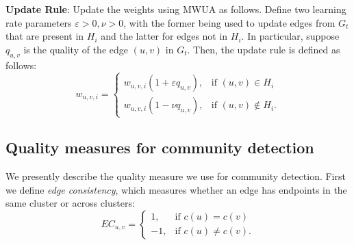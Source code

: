 \documentclass{article}
\begin{document}
\textbf{Update Rule}: Update the weights using MWUA as follows. Define two
learning rate parameters $\varepsilon > 0, \nu > 0$, with the former being used
to update edges from $G_t$ that are present in $H_i$ and the latter for edges
not in $H_i$. In particular, suppose $q_{u,v}$ is the quality of the edge
$(u,v)$ in $G_t$. Then, the update rule is defined as follows:
\[
w_{u,v,i}=
\begin{cases}
w_{u,v,i}(1 +\varepsilon q_{u,v}), & \text{if } (u,v) \in H_i \\
w_{u,v,i}(1 - \nu q_{u,v}), & \text{if } (u,v) \not \in H_i .
\end{cases}
\]
 \subsection{Quality measures for community detection}
\label{sec:quality-measures}
We presently describe the quality measure we use for community detection. First
we define {\em edge consistency}, which measures whether an edge has endpoints
in the same cluster or across clusters:
\[
   EC_{u,v}=
   \begin{cases}
   1, & \text{if  }c(u) = c(v) \\
   -1,  & \text{if  }c(u) \neq c(v).
   \end{cases}
\]
\end{document}
